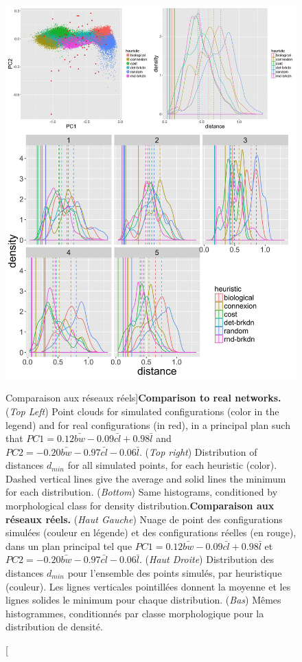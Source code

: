 \begin{figure}
\includegraphics[width=\linewidth,height=0.85\textheight]{Figures/Final/7-1-2-fig-networkgrowth-realdistance}
\caption[Comparison to real networks][Comparaison aux réseaux réels]{\textbf{Comparison to real networks.} (\textit{Top Left}) Point clouds for simulated configurations (color in the legend) and for real configurations (in red), in a principal plan such that $PC1 = 0.12 \bar{bw} - 0.09 \bar{cl} + 0.98 \bar{l}$ and $PC2 = -0.20 \bar{bw} - 0.97 \bar{cl} - 0.06 \bar{l}$. (\textit{Top right}) Distribution of distances $d_{min}$ for all simulated points, for each heuristic (color). Dashed vertical lines give the average and solid lines the minimum for each distribution. (\textit{Bottom}) Same histograms, conditioned by morphological class for density distribution.\label{fig:networkgrowth:realdistance}}{\textbf{Comparaison aux réseaux réels.} (\textit{Haut Gauche}) Nuage de point des configurations simulées (couleur en légende) et des configurations réelles (en rouge), dans un plan principal tel que $PC1 = 0.12 \bar{bw} - 0.09 \bar{cl} + 0.98 \bar{l}$ et $PC2 = -0.20 \bar{bw} - 0.97 \bar{cl} - 0.06 \bar{l}$. (\textit{Haut Droite}) Distribution des distances $d_{min}$ pour l'ensemble des points simulés, par heuristique (couleur). Les lignes verticales pointillées donnent la moyenne et les lignes solides le minimum pour chaque distribution. (\textit{Bas}) Mêmes histogrammes, conditionnés par classe morphologique pour la distribution de densité.\label{fig:networkgrowth:realdistance}}

\end{figure}
